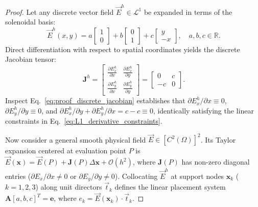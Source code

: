 \documentclass[preprint,12pt]{elsarticle}
\begin{document}
\begin{proof}
    Let any discrete vector field $\vec{E}^h \in \mathcal{L}^1$ be expanded in terms of the solenoidal basis:
    \begin{equation}
        \vec{E}^h(x, y) = a \begin{bmatrix} 1 \\ 0 \end{bmatrix} + b \begin{bmatrix} 0 \\ 1 \end{bmatrix} + c \begin{bmatrix} y \\ -x \end{bmatrix}, \quad a, b, c \in \mathbb{R}.
        \label{eq:proof_L1_expansion}
    \end{equation}
    Direct differentiation with respect to spatial coordinates yields the discrete Jacobian tensor:
    \begin{equation}
        \mathbf{J}^h = \begin{bmatrix}
            \frac{\partial E_x^h}{\partial x} & \frac{\partial E_x^h}{\partial y} \\[4pt]
            \frac{\partial E_y^h}{\partial x} & \frac{\partial E_y^h}{\partial y}
        \end{bmatrix} = \begin{bmatrix}
            0  & c \\
            -c & 0
        \end{bmatrix}.
        \label{eq:proof_discrete_jacobian}
    \end{equation}
    Inspect Eq.~\eqref{eq:proof_discrete_jacobian} establishes that $\partial E_x^h/\partial x \equiv 0$, $\partial E_y^h/\partial y \equiv 0$, and $\partial E_x^h/\partial y + \partial E_y^h/\partial x = c - c \equiv 0$, identically satisfying the linear constraints in Eq.~\eqref{eq:L1_derivative_constraints}.

    Now consider a general smooth physical field $\vec{E} \in [C^2(\Omega)]^2$. Its Taylor expansion centered at evaluation point $P$ is $\vec{E}(\mathbf{x}) = \vec{E}(P) + \mathbf{J}(P) \Delta\mathbf{x} + \mathcal{O}(h^2)$, where $\mathbf{J}(P)$ has non-zero diagonal entries ($\partial E_x/\partial x \neq 0$ or $\partial E_y/\partial y \neq 0$). Collocating $\vec{E}^h$ at support nodes $\mathbf{x}_k$ ($k=1,2,3$) along unit directors $\vec{t}_k$ defines the linear placement system $\mathbf{A} [a, b, c]^T = \mathbf{e}$, where $e_k = \vec{E}(\mathbf{x}_k) \cdot \vec{t}_k$.


\end{proof}
\end{document}
